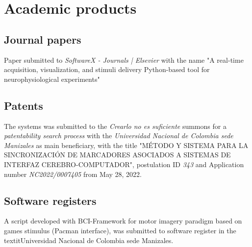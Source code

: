 \section{Academic products}

\subsection{Journal papers}
Paper submitted to \textit{SoftwareX - Journals | Elsevier} with the name "A real-time acquisition, visualization, and stimuli delivery Python-based tool for neurophysiological experiments"

\subsection{Patents}
The systems was submitted to the \textit{Crearlo no es suficiente} summons for a \textit{patentability search process} with the \textit{Universidad Nacional de Colombia sede Manizales} as main beneficiary, with the title "MÉTODO Y SISTEMA PARA LA SINCRONIZACIÓN DE MARCADORES ASOCIADOS A SISTEMAS DE INTERFAZ CEREBRO-COMPUTADOR", postulation ID \textit{343} and Application number \textit{NC2022/0007405} from May 28, 2022.

\subsection{Software registers}
A script developed with BCI-Framework for motor imagery paradigm based on games stimulus (Pacman interface), was submitted to software register in the textit{Universidad Nacional de Colombia sede Manizales}.
